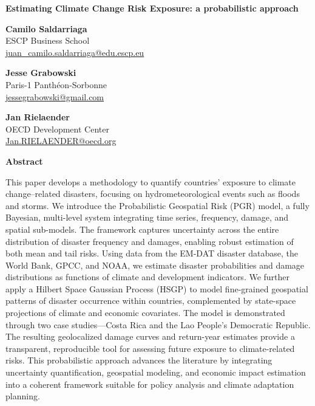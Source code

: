 
\begin{titlepage}
\raggedright

{\fontsize{36pt}{40pt}\selectfont\bfseries\color{OECDblue}
Estimating Climate Change Risk Exposure: a probabilistic approach\par}

\vspace{2cm}

\raggedleft
\setlength{\parskip}{0.3em}

\textbf{Camilo Saldarriaga}\\
ESCP Business School\\
\href{mailto:juan_camilo.saldarriaga@edu.escp.eu}{juan_camilo.saldarriaga@edu.escp.eu}

\vspace{1.5em}

\textbf{Jesse Grabowski}\\
Paris-1 Panth\'{e}on-Sorbonne\\
\href{mailto:jessegrabowski@gmail.com}{jessegrabowski@gmail.com}

\vspace{1.5em}

\textbf{Jan Rielaender}\\
OECD Development Center\\
\href{mailto:Jan.RIELAENDER@oecd.org}{Jan.RIELAENDER@oecd.org}

\vspace{2cm}

\raggedright
\textbf{Abstract}

\justifying
This paper develops a methodology to quantify countries' exposure to climate change--related disasters, focusing on hydrometeorological events such as floods and storms. We introduce the Probabilistic Geospatial Risk (PGR) model, a fully Bayesian, multi-level system integrating time series, frequency, damage, and spatial sub-models. The framework captures uncertainty across the entire distribution of disaster frequency and damages, enabling robust estimation of both mean and tail risks. Using data from the EM-DAT disaster database, the World Bank, GPCC, and NOAA, we estimate disaster probabilities and damage distributions as functions of climate and development indicators. We further apply a Hilbert Space Gaussian Process (HSGP) to model fine-grained geospatial patterns of disaster occurrence within countries, complemented by state-space projections of climate and economic covariates. The model is demonstrated through two case studies---Costa Rica and the Lao People's Democratic Republic. The resulting geolocalized damage curves and return-year estimates provide a transparent, reproducible tool for assessing future exposure to climate-related risks. This probabilistic approach advances the literature by integrating uncertainty quantification, geospatial modeling, and economic impact estimation into a coherent framework suitable for policy analysis and climate adaptation planning.


\end{titlepage}
